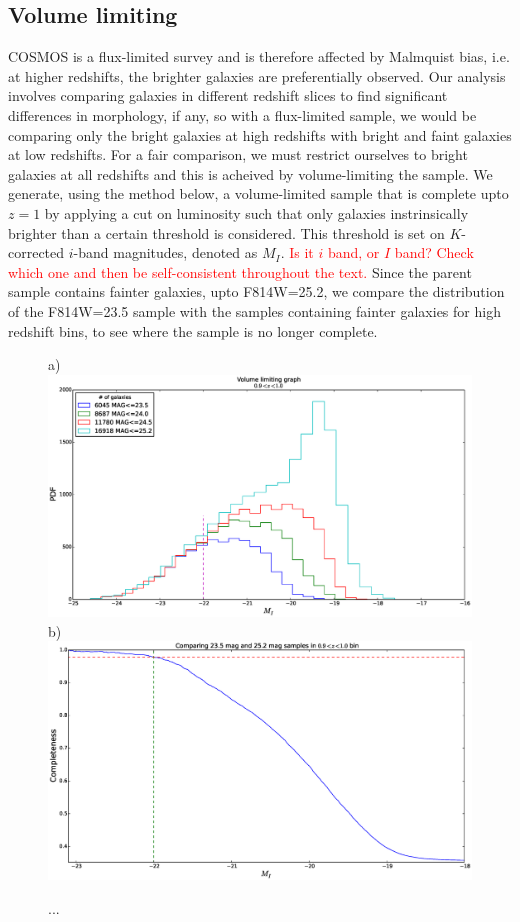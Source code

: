 \documentclass[twocolumn,useAMS,usenatbib]{mn2e}
\newcommand{\rachel}[1]{{\textcolor{red}{#1}}}
\begin{document}
\subsection{Volume limiting}
\label{sub:volumelimiting}
COSMOS is a flux-limited survey and is therefore affected by Malmquist bias, i.e. at higher redshifts, the brighter galaxies are preferentially observed.
Our analysis involves comparing galaxies in different redshift slices to find significant differences in morphology, if any, so with a flux-limited sample, we would be comparing only the bright galaxies at high redshifts with
bright and faint galaxies at low redshifts. For a fair comparison, we must restrict ourselves to bright galaxies at all redshifts and this is acheived by volume-limiting the sample.
We generate, using the method below, a volume-limited sample that is complete upto $z=1$ by applying a cut on luminosity such that only galaxies instrinsically brighter than a certain threshold is considered. This threshold is set on $K$-corrected $i$-band magnitudes, denoted as $M_I$.
\rachel{Is it $i$ band, or $I$ band?  Check which one and then be
  self-consistent throughout the text.}
Since the parent sample contains fainter galaxies, upto F814W=25.2, we compare the distribution of the F814W=23.5 sample with the samples containing fainter galaxies for high redshift bins, to see where the sample is no longer complete.
\begin{figure}
 \centering
 a) \includegraphics[width=\columnwidth]{volume_limiting_pdf}
 b) \includegraphics[width=\columnwidth]{volume_limiting_cdf}
 \label{fig:volume_limiting_dist}
 \caption{ ... }
\end{figure}
\end{document}
